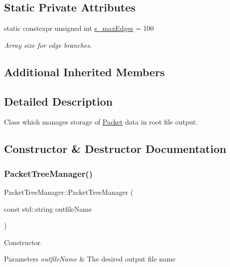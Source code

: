 \subsection*{Static Private Attributes}
\begin{DoxyCompactItemize}
\item 
static constexpr unsigned int \hyperlink{class_packet_tree_manager_a4ba06517ad1cb912ff70df1ff69231a5}{s\+\_\+max\+Edges} = 100
\begin{DoxyCompactList}\small\item\em Array size for edge branches. \end{DoxyCompactList}\end{DoxyCompactItemize}
\subsection*{Additional Inherited Members}


\subsection{Detailed Description}
Class which manages storage of \hyperlink{class_packet}{Packet} data in root file output. 

\subsection{Constructor \& Destructor Documentation}
\mbox{\label{class_packet_tree_manager_acab253ad1d9eb8d7b316d05f52bd064e}} 
\subsubsection{\texorpdfstring{Packet\+Tree\+Manager()}{PacketTreeManager()}}
{\footnotesize\ttfamily Packet\+Tree\+Manager\+::\+Packet\+Tree\+Manager (\begin{DoxyParamCaption}\item[{const std\+::string}]{outfile\+Name }\end{DoxyParamCaption})}



Constructor. 


\begin{DoxyParams}{Parameters}
{\em outfile\+Name} & The desired output file name \\
\hline
\end{DoxyParams}


